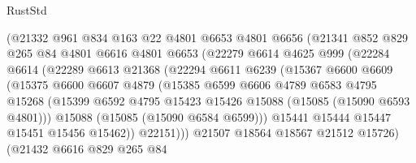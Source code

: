 \begin{lexlean}{RustStd}
\begin{coremodule}
                    (@21332
                      @961
                      @834
                      @163
                      @22
                      @4801
                      @6653
                      @4801
                      @6656
                      (@21341
                        @852
                        @829
                        @265
                        @84
                        @4801
                        @6616
                        @4801
                        @6653
                        (@22279
                          @6614
                          @4625
                          @999
                          (@22284
                            @6614
                            (@22289
                              @6613
                              @21368
                              (@22294
                                @6611
                                @6239
                                (@15367
                                  @6600
                                  @6609
                                  (@15375
                                    @6600
                                    @6607
                                    @4879
                                    (@15385
                                      @6599
                                      @6606
                                      @4789
                                      @6583
                                      @4795
                                      @15268
                                      (@15399
                                        @6592
                                        @4795
                                        @15423
                                        @15426
                                        @15088
                                        (@15085 (@15090 @6593 @4801)))
                                      @15088
                                      (@15085 (@15090 @6584 @6599)))
                                    @15441
                                    @15444
                                    @15447
                                    @15451
                                    @15456
                                    @15462))
                                @22151)))
                          @21507
                          @18564
                          @18567
                          @21512
                          @15726)
                        (@21432
                          @6616
                          @829
                          @265
                          @84

\end{coremodule}
\end{lexlean}
